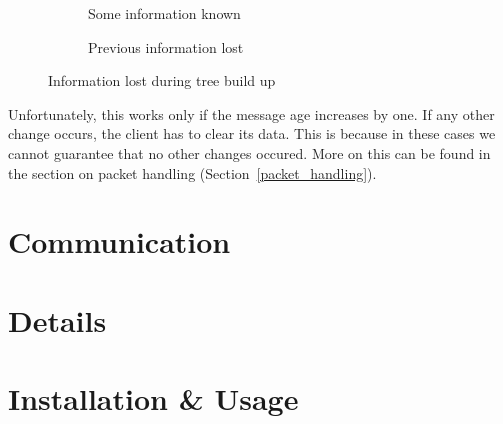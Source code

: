 \begin{figure}
    \begin{centering}
        \begin{subfigure}[b]{0.4\textwidth}
            \caption{Some information known}
        \end{subfigure}
        \hspace{1cm}
        \begin{subfigure}[b]{0.4\textwidth}
            \caption{Previous information lost}
        \end{subfigure}
        \caption{Information lost during tree build up}
    \end{centering}
\end{figure}
Unfortunately, this works only if the message age increases by one.
If any other change occurs, the client has to clear its data.
This is because in these cases we cannot guarantee that no other changes occured.
More on this can be found in the section on packet handling (Section~\ref{packet_handling}).

\section{Communication}
\section{Details}
\section{Installation \& Usage}
